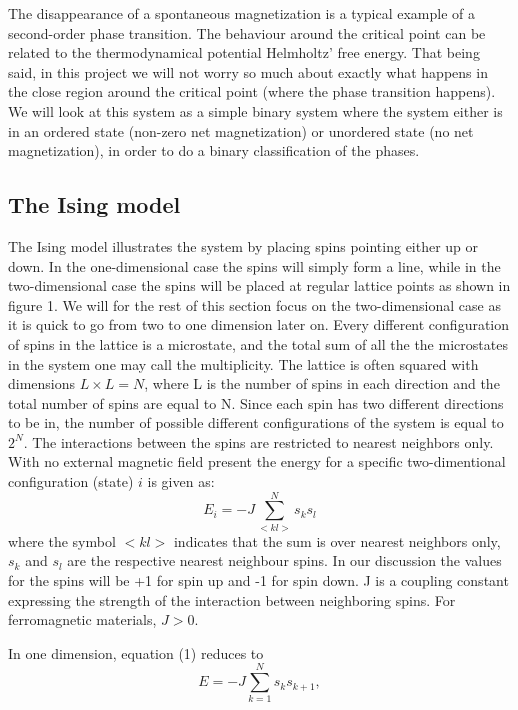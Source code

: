 \documentclass[a4paper,12pt]{article}
\begin{document}
The disappearance of a spontaneous magnetization is a typical example of a second-order phase transition. The behaviour around the critical point can be related to the thermodynamical potential Helmholtz' free energy. That being said, in this project we will not worry so much about exactly what happens in the close region around the critical point (where the phase transition happens). We will look at this system as a simple binary system where the system either is in an ordered state (non-zero net magnetization) or unordered state (no net magnetization), in order to do a binary classification of the phases.\newline

\subsection{The Ising model}
The Ising model illustrates the system by placing spins pointing either up or down. In the one-dimensional case the spins will simply form a line, while in the two-dimensional case the spins will be placed at regular lattice points as shown in figure 1. We will for the rest of this section focus on the two-dimensional case as it is quick to go from two to one dimension later on. Every different configuration of spins in the lattice is a microstate, and  the total sum of all the the microstates in the system one may call the multiplicity. The lattice is often squared with dimensions $L \times L = N$, where L is the number of spins in each direction and the total number of spins are equal to N. Since each spin has two different directions to be in, the number of possible different configurations of the system is equal to $2^N$. The interactions between the spins are restricted to nearest neighbors only.\newline
With no external magnetic field present the energy for a specific two-dimentional configuration (state) $i$ is given as:
\begin{equation}
    E_i = -J \sum_{<kl>}^{N} s_k s_l
\end{equation}
where the symbol $<kl>$ indicates that the sum is over nearest neighbors only, $s_k$ and $s_l$ are the respective nearest neighbour spins. In our discussion the values for the spins will be +1 for spin up and -1 for spin down. J is a coupling constant expressing the strength of the interaction between neighboring spins. For ferromagnetic materials, $J > 0$.\newline

In one dimension, equation (1) reduces to
\begin{equation}
    E = - J\sum_{k=1}^{N} s_k s_{k+1},
\end{equation}
\end{document}

